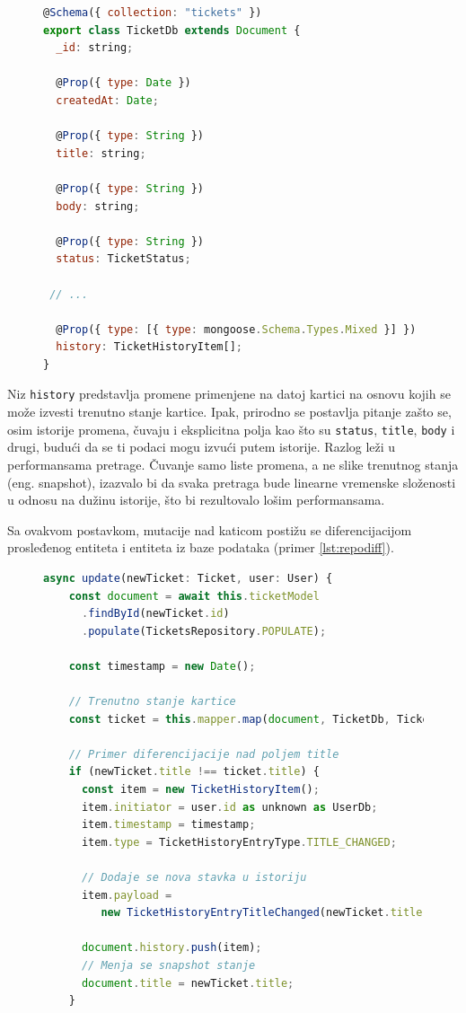 \documentclass[12pt,oneside]{memoir}
\begin{document}
\begin{figure}[h]
\begin{lstlisting}[language=JavaScript, style=ES6, caption={Definicija sheme kartica.}, label={lst:ticketschema}]
@Schema({ collection: "tickets" })
export class TicketDb extends Document {
  _id: string;

  @Prop({ type: Date })
  createdAt: Date;

  @Prop({ type: String })
  title: string;

  @Prop({ type: String })
  body: string;

  @Prop({ type: String })
  status: TicketStatus;

 // ...

  @Prop({ type: [{ type: mongoose.Schema.Types.Mixed }] })
  history: TicketHistoryItem[];
}
\end{lstlisting}
\end{figure}


\newpage
Niz \verb|history| predstavlja promene primenjene na datoj kartici na osnovu kojih se može izvesti trenutno stanje kartice. Ipak, prirodno se postavlja pitanje zašto se, osim istorije promena, čuvaju i eksplicitna polja kao što su \verb|status|, \verb|title|, \verb|body| i drugi, budući da se ti podaci mogu izvući putem istorije. Razlog leži u performansama pretrage. Čuvanje samo liste promena, a ne slike trenutnog stanja (eng. snapshot), izazvalo bi da svaka pretraga bude linearne vremenske složenosti u odnosu na dužinu istorije, što bi rezultovalo lošim performansama.

Sa ovakvom postavkom, mutacije nad katicom postižu se diferencijacijom prosleđenog entiteta i entiteta iz baze podataka (primer \ref{lst:repodiff}).

\begin{figure}[h]
\begin{lstlisting}[language=JavaScript, style=ES6, caption={Fajl \textit{ticket.repository.ts}}, label={lst:repodiff}]
  async update(newTicket: Ticket, user: User) {
    const document = await this.ticketModel
      .findById(newTicket.id)
      .populate(TicketsRepository.POPULATE); 

    const timestamp = new Date();

    // Trenutno stanje kartice
    const ticket = this.mapper.map(document, TicketDb, Ticket);

    // Primer diferencijacije nad poljem title
    if (newTicket.title !== ticket.title) {
      const item = new TicketHistoryItem();
      item.initiator = user.id as unknown as UserDb;
      item.timestamp = timestamp;
      item.type = TicketHistoryEntryType.TITLE_CHANGED;

      // Dodaje se nova stavka u istoriju
      item.payload = 
         new TicketHistoryEntryTitleChanged(newTicket.title);
         
      document.history.push(item);
      // Menja se snapshot stanje
      document.title = newTicket.title;
    }
\end{lstlisting}
\end{figure}
\end{document}
